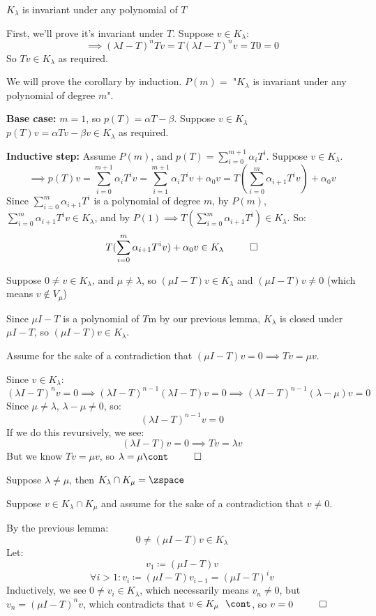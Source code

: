 \documentclass[10pt]{article}
\begin{document}
\begin{corollary}{$K_\lambda$ is invariant under any polynomial of $T$}

First, we'll prove it's invariant under $T$. Suppose $v\in K_\lambda$:
\[ \implies (\lambda I - T)^nTv = T(\lambda I - T)^nv = T0 = 0 \]
So $Tv\in K_\lambda$ as required.

We will prove the corollary by induction. $P(m)=$ "$K_\lambda$ is invariant under any polynomial of degree $m$".

\textbf{Base case:} $m=1$, so $p(T)=\alpha T-\beta$. Suppose $v\in K_\lambda$ $p(T)v=\alpha Tv-\beta v\in K_\lambda$ as required.

\textbf{Inductive step:} Assume $P(m)$, and $p(T) = \sum_{i=0}^{m+1} \alpha_i T^i$. Suppose $v\in K_\lambda$.
\[ \implies p(T)v = \sum_{i=0}^{m+1} \alpha_i T^iv = \sum_{i=1}^{m+1} \alpha_i T^iv + \alpha_0 v = T(\sum_{i=0}^m \alpha_{i+1}T^iv) + \alpha_0v \]
Since $\displaystyle\sum_{i=0}^m \alpha_{i+1}T^i$ is a polynomial of degree $m$, by $P(m)$, $\displaystyle\sum_{i=0}^m \alpha_{i+1}T^iv \in K_\lambda$, and by $P(1)\implies T(\displaystyle\sum_{i=0}^m \alpha_{i+1}T^i)\in K_\lambda$. So:
\[ T(\sum_{i=0}^m \alpha_{i+1}T^iv) + \alpha_0v \in K_\lambda  ~~ \qed \]

\end{corollary}

\begin{lemma}{Suppose $0\neq v\in K_\lambda$, and $\mu\neq\lambda$, so $(\mu I - T)v\in K_\lambda$ and $(\mu I-T)v\neq0$ (which means $v\notin V_\mu$)}

Since $\mu I - T$ is a polynomial of $T$m by our previous lemma, $K_\lambda$ is closed under $\mu I - T$, so $(\mu I - T)v\in K_\lambda$.

Assume for the sake of a contradiction that $(\mu I - T)v = 0 \implies Tv = \mu v$.

Since $v\in K_\lambda$:
\[ (\lambda I - T)^nv = 0 \implies (\lambda I - T)^{n-1}(\lambda I - T)v = 0 \implies (\lambda I - T)^{n-1}(\lambda - \mu)v = 0 \]
Since $\mu\neq\lambda$, $\lambda-\mu\neq0$, so:
\[ (\lambda I - T)^{n-1}v = 0 \]
If we do this revursively, we see:
\[ (\lambda I - T)v = 0 \implies Tv = \lambda v \]
But we know $Tv=\mu v$, so $\lambda=\mu \cont ~~ \qed$
\end{lemma}

\begin{lemma}{Suppose $\lambda\neq\mu$, then $K_\lambda\cap K_\mu = \zspace$}

Suppose $v\in K_\lambda\cap K_\mu$ and assume for the sake of a contradiction that $v\neq0$. 

By the previous lemma:
\[ 0\neq(\mu I - T)v\in K_\lambda \]
Let:
\[ v_1\coloneqq (\mu I-T)v \]
\[ \forall i>1: v_i\coloneqq (\mu I-T)v_{i-1} = (\mu I-T)^iv \]
Inductively, we see $0\neq v_i\in K_\lambda$, which necessarily means $v_n\neq0$, but $v_n=(\mu I - T)^nv$, which contradicts that $v\in K_\mu ~~ \cont$, so $v=0 ~~ \qed$

\end{lemma}
\end{document}
